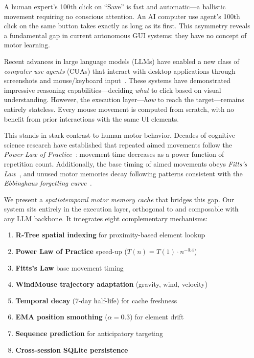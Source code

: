 \documentclass[conference]{IEEEtran}
\begin{document}
A human expert's 100th click on ``Save'' is fast and automatic---a ballistic movement requiring no conscious attention. An AI computer use agent's 100th click on the same button takes exactly as long as its first. This asymmetry reveals a fundamental gap in current autonomous GUI systems: they have no concept of motor learning.

Recent advances in large language models (LLMs) have enabled a new class of \emph{computer use agents} (CUAs) that interact with desktop applications through screenshots and mouse/keyboard input~\cite{anthropic2024computer,openai2025operator,zhang2024ufo}. These systems have demonstrated impressive reasoning capabilities---deciding \emph{what} to click based on visual understanding. However, the execution layer---\emph{how} to reach the target---remains entirely stateless. Every mouse movement is computed from scratch, with no benefit from prior interactions with the same UI elements.

This stands in stark contrast to human motor behavior. Decades of cognitive science research have established that repeated aimed movements follow the \emph{Power Law of Practice}~\cite{newell1981}: movement time decreases as a power function of repetition count. Additionally, the base timing of aimed movements obeys \emph{Fitts's Law}~\cite{fitts1954}, and unused motor memories decay following patterns consistent with the \emph{Ebbinghaus forgetting curve}~\cite{ebbinghaus1885}.

We present a \emph{spatiotemporal motor memory cache} that bridges this gap. Our system sits entirely in the execution layer, orthogonal to and composable with any LLM backbone. It integrates eight complementary mechanisms:

\begin{enumerate}[noitemsep,topsep=0pt]
    \item \textbf{R-Tree spatial indexing} for proximity-based element lookup
    \item \textbf{Power Law of Practice} speed-up ($T(n) = T(1) \cdot n^{-0.4}$)
    \item \textbf{Fitts's Law} base movement timing
    \item \textbf{WindMouse trajectory adaptation} (gravity, wind, velocity)
    \item \textbf{Temporal decay} (7-day half-life) for cache freshness
    \item \textbf{EMA position smoothing} ($\alpha{=}0.3$) for element drift
    \item \textbf{Sequence prediction} for anticipatory targeting
    \item \textbf{Cross-session SQLite persistence}
\end{enumerate}
\end{document}
